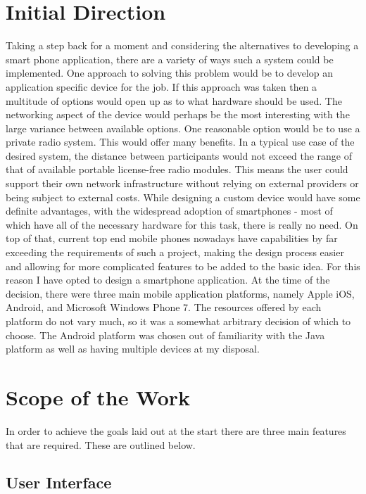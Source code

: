 \section{Initial Direction}

Taking a step back for a moment and considering the alternatives to developing a smart phone application, there are a variety of ways such a system could be implemented. One approach to solving this problem would be to develop an application specific device for the job. If this approach was taken then a multitude of options would open up as to what hardware should be used.
The networking aspect of the device would perhaps be the most interesting with the large variance between available options.
One reasonable option would be to use a private radio system. This would offer many benefits. In a typical use case of the desired system, the distance between participants would not exceed the range of that of available portable license-free radio modules. This means the user could support their own network infrastructure without relying on external providers or being subject to external costs.
While designing a custom device would have some definite advantages, with the widespread adoption of smartphones - most of which have all of the necessary hardware for this task, there is really no need.
On top of that, current top end mobile phones nowadays have capabilities by far exceeding the requirements of such a project, making the design process easier and allowing for more complicated features to be added to the basic idea.
For this reason I have opted to design a smartphone application. At the time of the decision, there were three main mobile application platforms, namely Apple iOS, Android, and Microsoft Windows Phone 7. The resources offered by each platform do not vary much, so it was a somewhat arbitrary decision of which to choose. The Android platform was chosen out of familiarity with the Java platform as well as having multiple devices at my disposal.

\section{Scope of the Work}

In order to achieve the goals laid out at the start there are three main features that are required. These are outlined below.

\subsection{User Interface}


